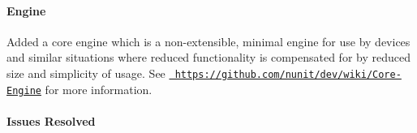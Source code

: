 \paragraph*{Engine}


\begin{DoxyItemize}
\item Added a core engine which is a non-\/extensible, minimal engine for use by devices and similar situations where reduced functionality is compensated for by reduced size and simplicity of usage. See \href{https://github.com/nunit/dev/wiki/Core-Engine}{\texttt{ https\+://github.\+com/nunit/dev/wiki/\+Core-\/\+Engine}} for more information.
\end{DoxyItemize}

\paragraph*{Issues Resolved}



